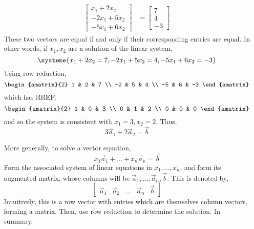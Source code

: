 \documentclass[letterpaper,12pt]{article}
\begin{document}
\begin{example}
\begin{align*}
    \begin{bmatrix} x_1 + 2x_2 \\ -2x_1 + 5x_2 \\ -5x_1 + 6x_2 \end{bmatrix} & = \begin{bmatrix} 7 \\ 4 \\ -3 \end{bmatrix}
\end{align*}
These two vectors are equal if and only if their corresponding entries are equal. In other words, if $x_1, x_2$ are a solution of the linear system,
\begin{equation*}
    \systeme{x_1 + 2x_2 = 7, -2x_1 + 5x_2 = 4, -5x_1 + 6x_2 = -3}
\end{equation*}
Using row reduction,
\begin{equation*}
    \begin{amatrix}{2} 1 & 2 & 7 \\ -2 & 5 & 4 \\ -5 & 6 & -3 \end{amatrix}
\end{equation*}
which has RREF,
\begin{equation*}
    \begin{amatrix}{2} 1 & 0 & 3 \\ 0 & 1 & 2 \\ 0 & 0 & 0 \end{amatrix}
\end{equation*}
and so the system is consistent with $x_1 = 3, x_2 = 2$. Thus,
\begin{equation*}
    3\vec{a}_1 + 2\vec{a}_2 = \vec{b}
\end{equation*}
\end{example}

More generally, to solve a vector equation,
\begin{equation*}
    x_1 \vec{a}_1 + \dots + x_n \vec{a}_n = \vec{b}
\end{equation*}
Form the associated system of linear equations in $x_1, \dots, x_n$, and form its augmented matrix, whose columns will be $\vec{a}_1, \dots, \vec{a}_n, \vec{b}$. This is denoted by,
\begin{equation*}
    \begin{bmatrix} \vec{a}_1 & \vec{a}_2 & \dots & \vec{a}_n & \vec{b} \end{bmatrix}
\end{equation*}
Intuitively, this is a row vector with entries which are themselves column vectors, forming a matrix. Then, use row reduction to determine the solution. In summary,
\end{document}
